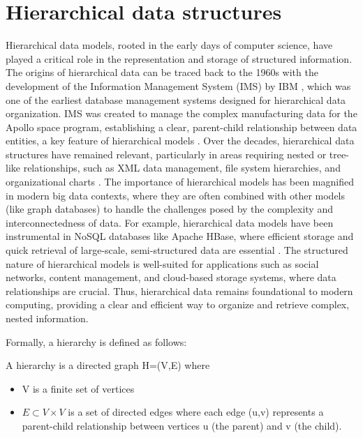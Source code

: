 \section{Hierarchical data structures}
Hierarchical data models, rooted in the early days of computer science, have played a critical role in the representation and storage of structured information. 
The origins of hierarchical data can be traced back to the 1960s with the development of the Information Management System (IMS) by IBM \cite{IBMIMS}, which was one of the earliest database management systems designed for hierarchical data organization.  
IMS was created to manage the complex manufacturing data for the Apollo space program, establishing a clear, parent-child relationship between data entities, a key feature of hierarchical models \cite{DBLP:books/daglib/0006734}. 
Over the decades, hierarchical data structures have remained relevant, particularly in areas requiring nested or tree-like relationships, such as XML data management, file system hierarchies, and organizational charts \cite{DBLP:books/mk/BunemanSA99}. 
The importance of hierarchical models has been magnified in modern big data contexts, where they are often combined with other models (like graph databases) to handle the challenges posed by the complexity and interconnectedness of data. 
For example, hierarchical data models have been instrumental in NoSQL databases like Apache HBase, where efficient storage and quick retrieval of large-scale, semi-structured data are essential \cite{DBLP:books/daglib/0027893}. 
The structured nature of hierarchical models is well-suited for applications such as social networks, content management, and cloud-based storage systems, where data relationships are crucial. 
Thus, hierarchical data remains foundational to modern computing, providing a clear and efficient way to organize and retrieve complex, nested information. 

Formally, a hierarchy is defined as follows:

\begin{definition}
    A hierarchy is a directed graph H=(V,E) where
    \begin{itemize}
        \item V is a finite set of vertices
        \item $E \subset V \times V$ is a set of directed edges where each edge (u,v) represents a parent-child relationship between vertices u (the parent) and v (the child).
    \end{itemize} 
\end{definition}


